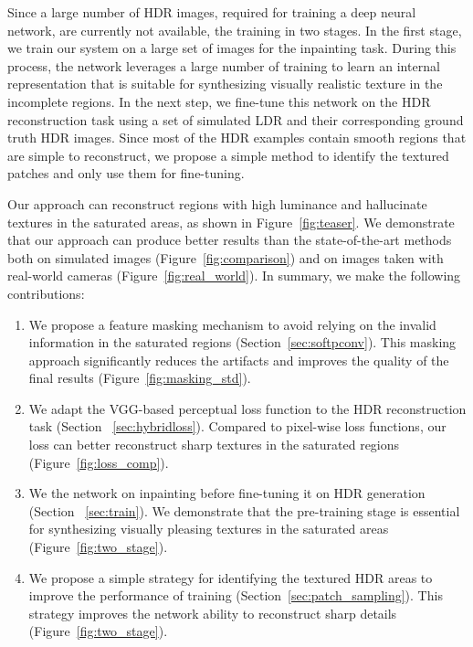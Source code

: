 Since a large number of HDR images, required for training a deep neural network, are currently not available,  the training in two stages. In the first stage, we train our system on a large set of images for the inpainting task. During this process, the network leverages a large number of training  to learn an internal representation that is suitable for synthesizing visually realistic texture in the incomplete regions. In the next step, we fine-tune this network on the HDR reconstruction task using a set of simulated LDR and their corresponding ground truth HDR images. Since most of the HDR examples contain smooth regions that are simple to reconstruct, we propose a simple method to identify the textured patches and only use them for fine-tuning.

Our approach can reconstruct regions with high luminance and hallucinate textures in the saturated areas, as shown in Figure~\ref{fig:teaser}. We demonstrate that our approach can produce better results than the state-of-the-art methods both on simulated images (Figure~\ref{fig:comparison}) and on images taken with real-world cameras (Figure~\ref{fig:real_world}). In summary, we make the following contributions:

\begin{enumerate}
    \item We propose a feature masking mechanism to avoid relying on the invalid information in the saturated regions (Section~\ref{sec:softpconv}). This masking approach significantly reduces the artifacts and improves the quality of the final results (Figure~\ref{fig:masking_std}).
    
    \item We adapt the VGG-based perceptual loss function to the HDR reconstruction task (Section~ \ref{sec:hybridloss}). Compared to pixel-wise loss functions, our loss can better reconstruct sharp textures in the saturated regions (Figure~\ref{fig:loss_comp}).
    
    \item We  the network on inpainting before fine-tuning it on HDR generation (Section~ \ref{sec:train}). We demonstrate that the pre-training stage is essential for synthesizing visually pleasing textures in the saturated areas (Figure~\ref{fig:two_stage}).
    
    \item We propose a simple strategy for identifying the textured HDR areas to improve the performance of training (Section~\ref{sec:patch_sampling}). This strategy improves the network ability to reconstruct sharp details (Figure~\ref{fig:two_stage}).
    
\end{enumerate}

